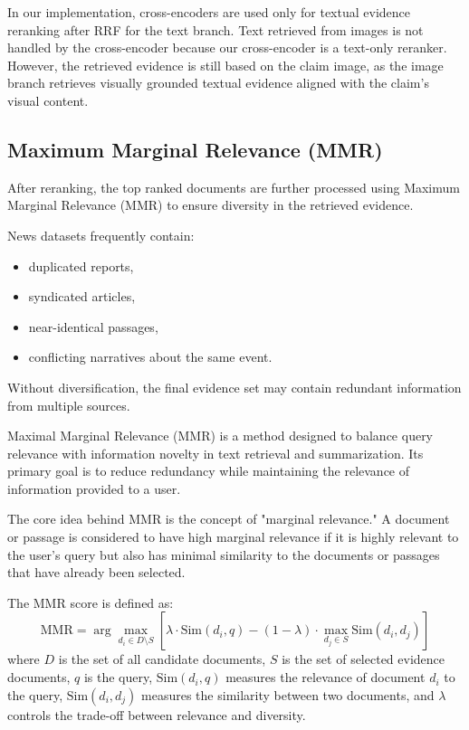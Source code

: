 In our implementation, cross-encoders are used only for textual evidence reranking after RRF for the text branch. Text retrieved from images is not handled by the cross-encoder because our cross-encoder is a text-only reranker. However, the retrieved evidence is still based on the claim image, as the image branch retrieves visually grounded textual evidence aligned with the claim's visual content.

\subsection{Maximum Marginal Relevance (MMR)}

After reranking, the top ranked documents are further processed using Maximum Marginal Relevance (MMR) to ensure diversity in the retrieved evidence.

News datasets frequently contain:
\begin{itemize}
    \item duplicated reports,
    \item syndicated articles,
    \item near-identical passages,
    \item conflicting narratives about the same event.
\end{itemize}

Without diversification, the final evidence set may contain redundant information from multiple sources.

Maximal Marginal Relevance (MMR) is a method designed to balance query relevance with information novelty in text retrieval and summarization. Its primary goal is to reduce redundancy while maintaining the relevance of information provided to a user.

The core idea behind MMR is the concept of "marginal relevance." A document or passage is considered to have high marginal relevance if it is highly relevant to the user's query but also has minimal similarity to the documents or passages that have already been selected.

The MMR score is defined as:
\begin{equation}
    \text{MMR} = \arg\max_{d_i \in D \setminus S} \left[ \lambda \cdot \text{Sim}(d_i, q) - (1-\lambda) \cdot \max_{d_j \in S} \text{Sim}(d_i, d_j) \right]
\end{equation}
where $D$ is the set of all candidate documents, $S$ is the set of selected evidence documents, $q$ is the query, $\text{Sim}(d_i, q)$ measures the relevance of document $d_i$ to the query, $\text{Sim}(d_i, d_j)$ measures the similarity between two documents, and $\lambda$ controls the trade-off between relevance and diversity.

